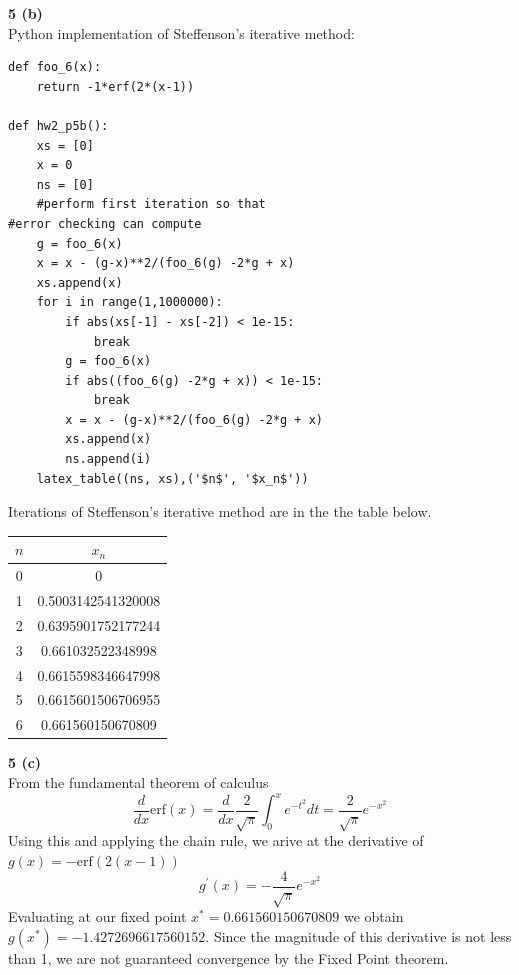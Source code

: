 \documentclass[12pt]{article}
\newcommand{\problem}[1]{\hspace{-4 ex} \large \textbf{#1}\\}
\begin{document}
\problem{5 (b)}
	Python implementation of Steffenson's iterative method:
	\singlespacing
	\begin{lstlisting}
def foo_6(x):
	return -1*erf(2*(x-1))
	
def hw2_p5b():
	xs = [0]
	x = 0
	ns = [0]
	#perform first iteration so that 
#error checking can compute
	g = foo_6(x)
	x = x - (g-x)**2/(foo_6(g) -2*g + x)
	xs.append(x)
	for i in range(1,1000000): 
		if abs(xs[-1] - xs[-2]) < 1e-15:
			break
		g = foo_6(x)
		if abs((foo_6(g) -2*g + x)) < 1e-15:
			break
		x = x - (g-x)**2/(foo_6(g) -2*g + x)
		xs.append(x)
		ns.append(i)
	latex_table((ns, xs),('$n$', '$x_n$'))
	\end{lstlisting}
	\doublespacing
	Iterations of Steffenson's iterative method are in the the table below.
	\begin{center}
		\begin{tabular}{|c|c|}
			\hline
			$n$&$x_n$\\ \hline
			0&0\\ \hline
			1&0.5003142541320008\\ \hline
			2&0.6395901752177244\\ \hline
			3&0.661032522348998\\ \hline
			4&0.6615598346647998\\ \hline
			5&0.6615601506706955\\ \hline
			6&0.661560150670809\\ \hline
		\end{tabular}
	\end{center}

\problem{5 (c)}
	From the fundamental theorem of calculus 
	$$
	\frac{d}{dx}\text{erf}(x) = \frac{d}{dx}\frac{2}{\sqrt{\pi}}\int_0^x e^{-t^2}dt = \frac{2}{\sqrt{\pi}} e^{-x^2}
	$$
	Using this and applying the chain rule, we arive at the derivative of $g(x) = -\text{erf}(2(x-1))$ \\
	$$
	g^\prime(x) = -\frac{4}{\sqrt{\pi}} e^{-x^2}
	$$
	Evaluating at our fixed point $x^* = 0.661560150670809$ we obtain $g(x^*) = -1.4272696617560152$. Since the magnitude of this derivative is not less than 1, we are not guaranteed convergence by the Fixed Point theorem.
	
\end{document}
